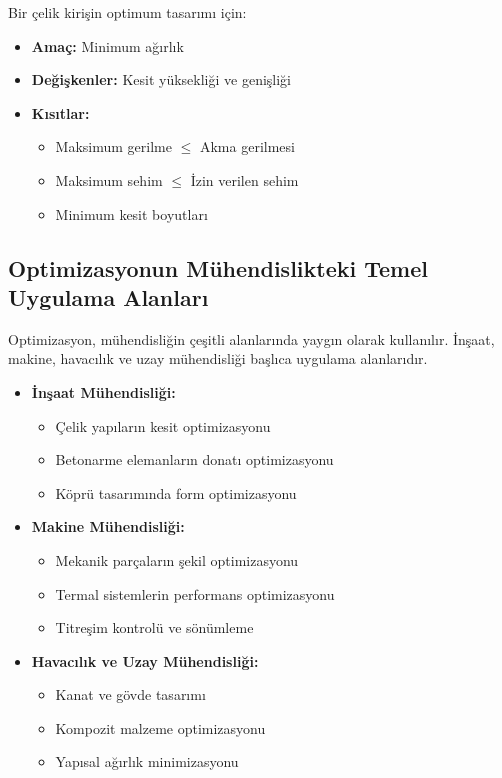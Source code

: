 \begin{tcolorbox}[title=Yapısal Optimizasyon Örneği]
Bir çelik kirişin optimum tasarımı için:
\begin{itemize}
    \item \textbf{Amaç:} Minimum ağırlık
    \item \textbf{Değişkenler:} Kesit yüksekliği ve genişliği
    \item \textbf{Kısıtlar:} 
        \begin{itemize}
            \item Maksimum gerilme $\leq$ Akma gerilmesi
            \item Maksimum sehim $\leq$ İzin verilen sehim
            \item Minimum kesit boyutları
        \end{itemize}
\end{itemize}
\end{tcolorbox}

\subsection{Optimizasyonun Mühendislikteki Temel Uygulama Alanları}
Optimizasyon, mühendisliğin çeşitli alanlarında yaygın olarak kullanılır. İnşaat, makine, havacılık ve uzay mühendisliği başlıca uygulama alanlarıdır.

\begin{itemize}
    \item \textbf{İnşaat Mühendisliği:}
        \begin{itemize}
            \item Çelik yapıların kesit optimizasyonu
            \item Betonarme elemanların donatı optimizasyonu
            \item Köprü tasarımında form optimizasyonu
        \end{itemize}
    \item \textbf{Makine Mühendisliği:}
        \begin{itemize}
            \item Mekanik parçaların şekil optimizasyonu
            \item Termal sistemlerin performans optimizasyonu
            \item Titreşim kontrolü ve sönümleme
        \end{itemize}
    \item \textbf{Havacılık ve Uzay Mühendisliği:}
        \begin{itemize}
            \item Kanat ve gövde tasarımı
            \item Kompozit malzeme optimizasyonu
            \item Yapısal ağırlık minimizasyonu
        \end{itemize}
\end{itemize}


